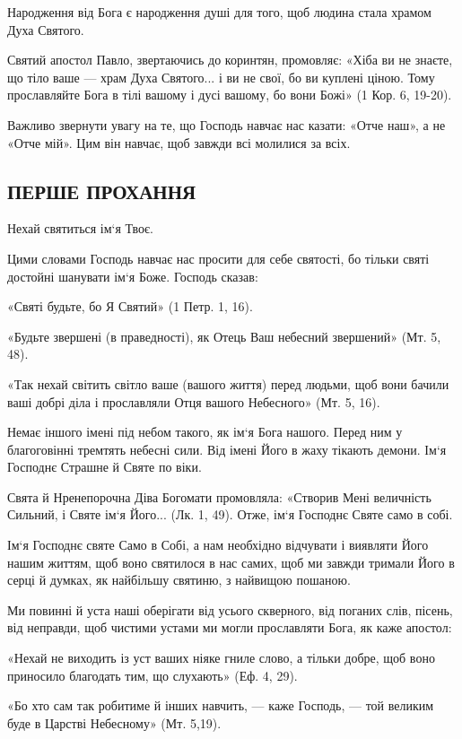 \documentclass[main.tex]{subfiles}
\begin{document}
Народження від Бога є народження душі для того, щоб людина стала храмом Духа Святого.

Святий апостол Павло, звертаючись до коринтян, промовляє: «Хіба ви не знаєте, що тіло ваше — храм Духа Святого... і ви не свої, бо ви куплені ціною. Тому прославляйте Бога в тілі вашому і дусі вашому, бо вони Божі» (1 Кор. 6, 19-20).

Важливо звернути увагу на те, що Господь навчає нас казати: «Отче наш», а не «Отче мій». Цим він навчає, щоб завжди всі молилися за всіх.
 
\subsection{ПЕРШЕ ПРОХАННЯ}

Нехай святиться ім`я Твоє.

Цими словами Господь навчає нас просити для себе святості, бо тільки святі достойні шанувати ім`я Боже. Господь сказав:

«Святі будьте, бо Я Святий» (1 Петр. 1, 16).

«Будьте звершені (в праведності), як Отець Ваш небесний звершений» (Мт. 5, 48).

«Так нехай світить світло ваше (вашого життя) перед людьми, щоб вони бачили ваші добрі діла і прославляли Отця вашого Небесного» (Мт. 5, 16).

Немає іншого імені під небом такого, як ім`я Бога нашого. Перед ним у благоговінні тремтять небесні сили. Від імені Його в жаху тікають демони. Ім`я Господнє Страшне й Святе по віки.

Свята й Нренепорочна Діва Богомати промовляла: «Створив Мені величність Сильний, і Святе ім`я Його... (Лк. 1, 49). Отже, ім`я Господнє Святе само в собі.

Ім`я Господнє святе Само в Собі, а нам необхідно відчувати і виявляти Його нашим життям, щоб воно святилося в нас самих, щоб ми завжди тримали Його в серці й думках, як найбільшу святиню, з найвищою пошаною.

Ми повинні й уста наші оберігати від усього скверного, від поганих слів, пісень, від неправди, щоб чистими устами ми могли прославляти Бога, як каже апостол:

«Нехай не виходить із уст ваших ніяке гниле слово, а тільки добре, щоб воно приносило благодать тим, що слухають» (Еф. 4, 29).

«Бо хто сам так робитиме й інших навчить, — каже Господь, — той великим буде в Царстві Небесному» (Мт. 5,19).
\end{document}
